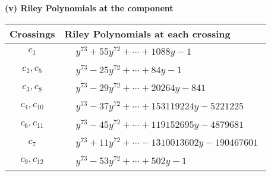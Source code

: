 \documentclass[1p]{elsarticle_modified}
\theoremstyle{definition}
\begin{document}
\flushleft \textbf{(v) Riley Polynomials at the component}\newline \\
\begin{tabular}{m{50pt}|m{274pt}}
Crossings & \hspace{64pt}Riley Polynomials at each crossing \\
\hline $$\begin{aligned}c_{1}\end{aligned}$$&$\begin{aligned}
&y^{73}+55 y^{72}+\cdots+1088 y-1
\end{aligned}$\\
\hline $$\begin{aligned}c_{2},c_{5}\end{aligned}$$&$\begin{aligned}
&y^{73}-25 y^{72}+\cdots+84 y-1
\end{aligned}$\\
\hline $$\begin{aligned}c_{3},c_{8}\end{aligned}$$&$\begin{aligned}
&y^{73}-29 y^{72}+\cdots+20264 y-841
\end{aligned}$\\
\hline $$\begin{aligned}c_{4},c_{10}\end{aligned}$$&$\begin{aligned}
&y^{73}-37 y^{72}+\cdots+153119224 y-5221225
\end{aligned}$\\
\hline $$\begin{aligned}c_{6},c_{11}\end{aligned}$$&$\begin{aligned}
&y^{73}-45 y^{72}+\cdots+119152695 y-4879681
\end{aligned}$\\
\hline $$\begin{aligned}c_{7}\end{aligned}$$&$\begin{aligned}
&y^{73}+11 y^{72}+\cdots-1310013602 y-190467601
\end{aligned}$\\
\hline $$\begin{aligned}c_{9},c_{12}\end{aligned}$$&$\begin{aligned}
&y^{73}-53 y^{72}+\cdots+502 y-1
\end{aligned}$\\
\hline
\end{tabular}\\~\\
\end{document}
